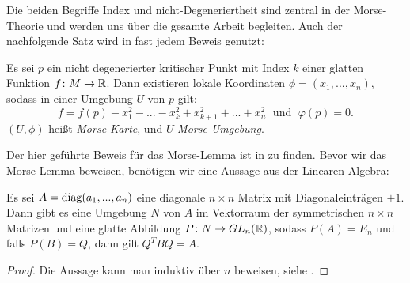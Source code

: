 Die beiden Begriffe Index und nicht-Degeneriertheit sind zentral in der Morse-Theorie 
und werden uns über die gesamte Arbeit begleiten. Auch der nachfolgende Satz wird in 
fast jedem Beweis genutzt:

\begin{theorem}
    \label{satz: morse-lemma}
    Es sei $p$ ein nicht degenerierter kritischer Punkt mit Index $k$ einer glatten 
    Funktion $f \colon M \to { \mathbb R }$. Dann existieren lokale Koordinaten 
    $\phi = (x_1, ..., x_n)$, sodass in einer Umgebung $U$ von $p$ gilt:
    \[ f = f(p) - x_1^2 - ... - x_k^2 + x_{k + 1}^2 + ... + x_n^2
        \; \text{ und } \;
        \varphi (p) = 0 . \]
    $(U, \phi)$ heißt \textit{Morse-Karte}, und $U$ \textit{Morse-Umgebung}.
\end{theorem}

Der hier geführte Beweis für das Morse-Lemma ist in \cite{hirsch} zu finden. 
Bevor wir das Morse Lemma beweisen, benötigen wir eine Aussage aus der Linearen Algebra:

\begin{lemma}
    \label{lemma: lina lemma}
    Es sei $A = { \operatorname{diag} }(a_1, ..., a_n)$ eine diagonale $n \times n$ Matrix mit 
    Diagonaleinträgen $\pm 1$. Dann gibt es eine Umgebung $N$ von $A$ im Vektorraum der 
    symmetrischen $n \times n$ Matrizen und eine glatte Abbildung 
    $P \colon N \to GL_n({ \mathbb R })$, sodass $P(A) = E_n$ und falls $P(B) = Q$, dann gilt 
    $Q^TBQ = A$.
\end{lemma}

\begin{proof}
    Die Aussage kann man induktiv über $n$ beweisen, siehe \cite{hirsch}.
\end{proof}

